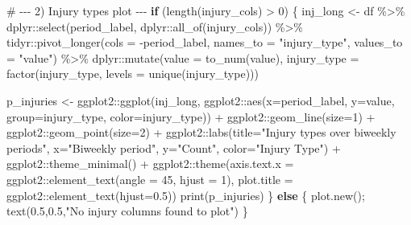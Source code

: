 \documentclass[
  letterpaper,
  DIV=11,
  numbers=noendperiod]{scrartcl}
\newenvironment{Shaded}{\begin{snugshade}}{\end{snugshade}}
\newcommand{\AttributeTok}[1]{\textcolor[rgb]{0.40,0.45,0.13}{#1}}
\newcommand{\CommentTok}[1]{\textcolor[rgb]{0.37,0.37,0.37}{#1}}
\newcommand{\ControlFlowTok}[1]{\textcolor[rgb]{0.00,0.23,0.31}{\textbf{#1}}}
\newcommand{\DecValTok}[1]{\textcolor[rgb]{0.68,0.00,0.00}{#1}}
\newcommand{\FloatTok}[1]{\textcolor[rgb]{0.68,0.00,0.00}{#1}}
\newcommand{\FunctionTok}[1]{\textcolor[rgb]{0.28,0.35,0.67}{#1}}
\newcommand{\NormalTok}[1]{\textcolor[rgb]{0.00,0.23,0.31}{#1}}
\newcommand{\OtherTok}[1]{\textcolor[rgb]{0.00,0.23,0.31}{#1}}
\newcommand{\SpecialCharTok}[1]{\textcolor[rgb]{0.37,0.37,0.37}{#1}}
\newcommand{\StringTok}[1]{\textcolor[rgb]{0.13,0.47,0.30}{#1}}
\begin{document}
\begin{Shaded}
\begin{Highlighting}[]
\CommentTok{\# {-}{-}{-} 2) Injury types plot {-}{-}{-}}
\ControlFlowTok{if}\NormalTok{ (}\FunctionTok{length}\NormalTok{(injury\_cols) }\SpecialCharTok{\textgreater{}} \DecValTok{0}\NormalTok{) \{}
\NormalTok{  inj\_long }\OtherTok{\textless{}{-}}\NormalTok{ df }\SpecialCharTok{\%\textgreater{}\%}
\NormalTok{    dplyr}\SpecialCharTok{::}\FunctionTok{select}\NormalTok{(period\_label, dplyr}\SpecialCharTok{::}\FunctionTok{all\_of}\NormalTok{(injury\_cols)) }\SpecialCharTok{\%\textgreater{}\%}
\NormalTok{    tidyr}\SpecialCharTok{::}\FunctionTok{pivot\_longer}\NormalTok{(}\AttributeTok{cols =} \SpecialCharTok{{-}}\NormalTok{period\_label, }\AttributeTok{names\_to =} \StringTok{"injury\_type"}\NormalTok{, }\AttributeTok{values\_to =} \StringTok{"value"}\NormalTok{) }\SpecialCharTok{\%\textgreater{}\%}
\NormalTok{    dplyr}\SpecialCharTok{::}\FunctionTok{mutate}\NormalTok{(}\AttributeTok{value =} \FunctionTok{to\_num}\NormalTok{(value),}
                  \AttributeTok{injury\_type =} \FunctionTok{factor}\NormalTok{(injury\_type, }\AttributeTok{levels =} \FunctionTok{unique}\NormalTok{(injury\_type)))}
  
\NormalTok{  p\_injuries }\OtherTok{\textless{}{-}}\NormalTok{ ggplot2}\SpecialCharTok{::}\FunctionTok{ggplot}\NormalTok{(inj\_long, ggplot2}\SpecialCharTok{::}\FunctionTok{aes}\NormalTok{(}\AttributeTok{x=}\NormalTok{period\_label, }\AttributeTok{y=}\NormalTok{value, }\AttributeTok{group=}\NormalTok{injury\_type, }\AttributeTok{color=}\NormalTok{injury\_type)) }\SpecialCharTok{+}
\NormalTok{    ggplot2}\SpecialCharTok{::}\FunctionTok{geom\_line}\NormalTok{(}\AttributeTok{size=}\DecValTok{1}\NormalTok{) }\SpecialCharTok{+}
\NormalTok{    ggplot2}\SpecialCharTok{::}\FunctionTok{geom\_point}\NormalTok{(}\AttributeTok{size=}\DecValTok{2}\NormalTok{) }\SpecialCharTok{+}
\NormalTok{    ggplot2}\SpecialCharTok{::}\FunctionTok{labs}\NormalTok{(}\AttributeTok{title=}\StringTok{"Injury types over biweekly periods"}\NormalTok{, }\AttributeTok{x=}\StringTok{"Biweekly period"}\NormalTok{, }\AttributeTok{y=}\StringTok{"Count"}\NormalTok{, }\AttributeTok{color=}\StringTok{"Injury Type"}\NormalTok{) }\SpecialCharTok{+}
\NormalTok{    ggplot2}\SpecialCharTok{::}\FunctionTok{theme\_minimal}\NormalTok{() }\SpecialCharTok{+}
\NormalTok{    ggplot2}\SpecialCharTok{::}\FunctionTok{theme}\NormalTok{(}\AttributeTok{axis.text.x =}\NormalTok{ ggplot2}\SpecialCharTok{::}\FunctionTok{element\_text}\NormalTok{(}\AttributeTok{angle =} \DecValTok{45}\NormalTok{, }\AttributeTok{hjust =} \DecValTok{1}\NormalTok{), }\AttributeTok{plot.title =}\NormalTok{ ggplot2}\SpecialCharTok{::}\FunctionTok{element\_text}\NormalTok{(}\AttributeTok{hjust=}\FloatTok{0.5}\NormalTok{))}
  \FunctionTok{print}\NormalTok{(p\_injuries)}
\NormalTok{\} }\ControlFlowTok{else}\NormalTok{ \{}
  \FunctionTok{plot.new}\NormalTok{(); }\FunctionTok{text}\NormalTok{(}\FloatTok{0.5}\NormalTok{,}\FloatTok{0.5}\NormalTok{,}\StringTok{"No injury columns found to plot"}\NormalTok{)}
\NormalTok{\}}
\end{Highlighting}
\end{Shaded}
\end{document}
